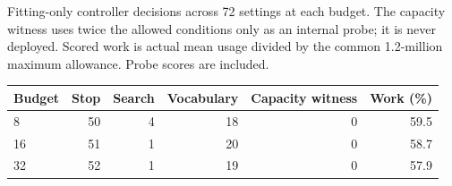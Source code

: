 \begin{kbtable}
\centering
\caption{Fitting-only controller decisions across 72 settings at each budget. The capacity witness uses twice the allowed conditions only as an internal probe; it is never deployed. Scored work is actual mean usage divided by the common 1.2-million maximum allowance. Probe scores are included.}
\label{tab:independent-actions}
\small
\begin{adjustbox}{max width=\linewidth}
\begin{tabular}{lrrrrr}
\toprule
Budget & Stop & Search & Vocabulary & Capacity witness & Work (\%) \\
\midrule
8 & 50 & 4 & 18 & 0 & 59.5 \\
16 & 51 & 1 & 20 & 0 & 58.7 \\
32 & 52 & 1 & 19 & 0 & 57.9 \\
\bottomrule
\end{tabular}
\end{adjustbox}
\end{kbtable}
